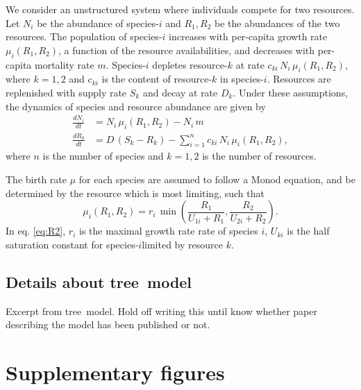 \documentclass[a4paper,11pt]{article}
\newcommand{\TREE}{{\sc tree}}
\begin{document}
We consider an unstructured system where individuals compete for two
resources. Let $N_i$ be the abundance of species-$i$ and $R_1, R_2$ be the
abundances of the two resources. The population of species-$i$ increases with
per-capita
growth rate $\mu_i(R_1,R_2)$, a function of the resource availabilities, and
decreases with per-capita mortality rate $m$. Species-$i$ depletes resource-$k$
at rate $c_{ki} \,  N_i \, \mu_i(R_1,R_2)$, where $k = 1, 2$ and $c_{ki}$ is
the content of resource-$k$ in species-$i$. Resources
are replenished
with supply rate $S_k$ and decay at rate $D_k$. Under these assumptions, the
dynamics of species and resource abundance are given by
\begin{subequations}
  \begin{align}
\label{eq:R1}
\frac{dN_i}{dt} &= N_i \, \mu_i(R_1,R_2) - N_i \, m \\
\frac{dR_k}{dt} &= D \, (S_k- R_k) - \sum_{i=1}^{n}{c_{ki} \, N_i \,
  \mu_i(R_1, R_2)},
\end{align}
\end{subequations}
where $n$ is the number of species and $k=1,2$ is the number of resources.

The birth rate $\mu$ for each species are assumed to follow a Monod equation,
and be determined by the resource which is most limiting, such that
\begin{equation}
\label{eq:R2}
\mu_i(R_1, R_2) = r_i \, \min \left(\frac{R_1}{U_{1i} + R_1},
                                    \frac{R_2}{U_{2i} + R_2} \right).
\end{equation}
In eq. \ref{eq:R2}, $r_i$ is the maximal growth rate rate of species $i$, $U_
{ki}$ is the half saturation constant for species-$i$limited by resource $k$.

\subsection{Details about \TREE\ model}\label{sec:TREE}

Excerpt from  \TREE\ model. Hold off writing this until know whether paper describing
the model has been published or not.

\section{Supplementary figures}
\end{document}
